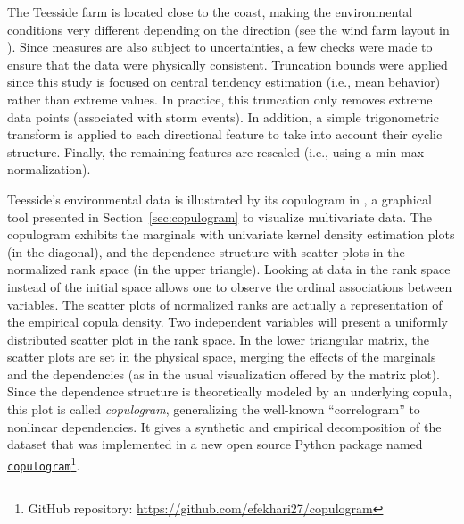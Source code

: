 
The Teesside farm is located close to the coast, making the environmental conditions very different depending on the direction (see the wind farm layout in ). 
Since measures are also subject to uncertainties, a few checks were made to ensure that the data were physically consistent. 
Truncation bounds were applied since this study is focused on central tendency estimation (i.e., mean behavior) rather than extreme values. 
In practice, this truncation only removes extreme data points (associated with storm events). 
In addition, a simple trigonometric transform is applied to each directional feature to take into account their cyclic structure. 
Finally, the remaining features are rescaled (i.e., using a min-max normalization). 

Teesside's environmental data is illustrated by its copulogram in , a graphical tool presented in Section~\ref{sec:copulogram} to visualize multivariate data. 
The copulogram exhibits the marginals with univariate kernel density estimation plots (in the diagonal), and the dependence structure with scatter plots in the normalized rank space (in the upper triangle). 
Looking at data in the rank space instead of the initial space allows one to observe the ordinal associations between variables. 
The scatter plots of normalized ranks are actually a representation of the empirical copula density.
Two independent variables will present a uniformly distributed scatter plot in the rank space. 
In the lower triangular matrix, the scatter plots are set in the physical space, merging the effects of the marginals and the dependencies (as in the usual visualization offered by the matrix plot). 
Since the dependence structure is theoretically modeled by an underlying copula, this plot is called \emph{copulogram}, generalizing the well-known ``correlogram'' to nonlinear dependencies. 
It gives a synthetic and empirical decomposition of the dataset that was implemented in a new open source Python package named \texttt{\href{https://github.com/efekhari27/copulogram}{copulogram}}\footnote{GitHub repository: \url{https://github.com/efekhari27/copulogram}}.

